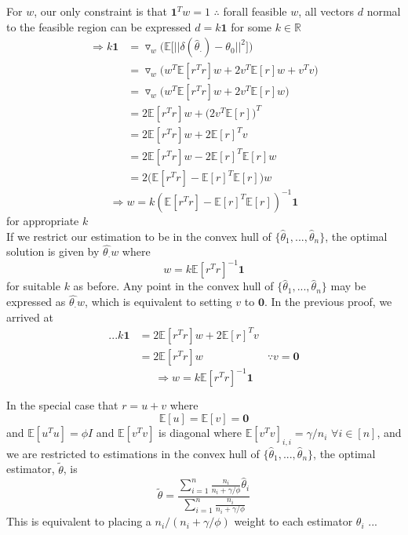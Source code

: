 \documentclass{article}
\begin{document}
For $w$, our only constraint is that $\mathbf{1}^Tw = 1$ $\therefore$ forall feasible $w$, all vectors $d$ normal to the feasible region can be expressed $d = k\mathbf{1}$ for some $k \in \mathbb{R}$ \\
\begin{align*}
\Rightarrow k \mathbf{1} &= \triangledown_w \bigg(\mathbb{E}\big[||\delta(\hat{\theta}_\cdot) - \theta_0||^2\big]\bigg)
\\&= \triangledown_w \Big(w^T\mathbb{E}[r^Tr]w + 2v^T\mathbb{E}[r]w+ v^Tv\Big)
\\&= \triangledown_w \Big(w^T\mathbb{E}[r^Tr]w + 2v^T\mathbb{E}[r]w\Big)
\\&= 2\mathbb{E}[r^Tr]w + \big(2v^T\mathbb{E}[r]\big)^T
\\&= 2\mathbb{E}[r^Tr]w + 2\mathbb{E}[r]^Tv
\\&= 2\mathbb{E}[r^Tr]w - 2\mathbb{E}[r]^T\mathbb{E}[r]w
\\&= 2\big(\mathbb{E}[r^Tr] - \mathbb{E}[r]^T\mathbb{E}[r]\big)w
\end{align*}
\[ \Rightarrow w = k(\mathbb{E}[r^Tr] - \mathbb{E}[r]^T\mathbb{E}[r])^{-1}\mathbf{1} \]
for appropriate $k$ \\

\corollary If we restrict our estimation to be in the convex hull of $\{\hat{\theta}_1,...,\hat{\theta}_n\}$, the optimal solution is given by $\hat{\theta_\cdot}w$ where
\[ w = k\mathbb{E}[r^Tr]^{-1}\mathbf{1} \]
for suitable $k$ as before.
\proof Any point in the convex hull of $\{\hat{\theta}_1,...,\hat{\theta}_n\}$ may be expressed as $\hat{\theta_\cdot}w$, which is equivalent to setting $v$ to $\mathbf{0}$. In the previous proof, we arrived at
\begin{align*}
...k\mathbf{1} &= 2\mathbb{E}[r^Tr]w + 2\mathbb{E}[r]^Tv
\\&= 2\mathbb{E}[r^Tr]w &\because v=\mathbf{0}
\end{align*}
\[ \Rightarrow w = k\mathbb{E}[r^Tr]^{-1}\mathbf{1} \]

\corollary In the special case that $r = u + v$ where
\[ \mathbb{E}[u] = \mathbb{E}[v] = \mathbf{0} \]
and $\mathbb{E}[u^Tu] = \phi I$ and $\mathbb{E}[v^Tv]$ is diagonal where $\mathbb{E}[v^Tv]_{i,i} = \gamma/n_i$ $\forall i \in [n]$, and we are restricted to estimations in the convex hull of $\{\hat{\theta}_1,...,\hat{\theta}_n\}$, the optimal estimator, $\tilde{\theta}$, is
\[ \tilde{\theta} = \frac{\sum_{i=1}^n \frac{n_i}{n_i+\gamma/\phi}\hat{\theta}_i}{\sum_{i=1}^n \frac{n_i}{n_i+\gamma/\phi}} \]
\remark This is equivalent to placing a $n_i/(n_i+\gamma/\phi)$ weight to each estimator $\theta_i$
\proof ...












%
\end{document}
